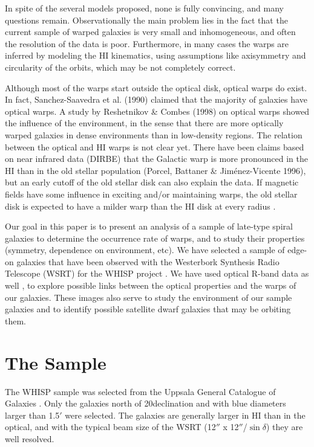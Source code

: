 \documentclass{aa}
\begin{document}
In spite of the several models proposed, none is fully
convincing, and many questions remain. Observationally the main
problem lies in the fact that the current sample of warped galaxies is
very small and inhomogeneous, and often 
the resolution of the data is poor. Furthermore, in
many cases the warps are inferred by modeling the HI
kinematics, using assumptions like axisymmetry and
circularity of the orbits, which may be not completely correct.

Although most of the warps start outside the optical disk,
optical warps do exist. In fact, Sanchez-Saavedra et al. (1990) claimed
that the majority of galaxies have optical warps. A  study by
Reshetnikov \& Combes (1998) on optical warps showed the influence of the 
environment, in the sense that there are more 
optically warped galaxies in dense environments than in low-density
regions. The relation between the optical and HI
warps is not clear yet. There have been claims based on near infrared
data (DIRBE) that the Galactic warp is more pronounced in 
the HI than in the old stellar population (Porcel, Battaner \&
Jim\'enez-Vicente 1996), but an early 
cutoff of the old stellar disk \cite{robin} can also explain the data. If
magnetic fields have 
some influence in exciting and/or maintaining warps, the old stellar
disk is expected to have a milder warp than the HI disk at every
radius \cite{jorge}.

Our goal in this paper is to present an analysis of a sample of late-type spiral galaxies to
determine the occurrence rate of warps, and to study their properties
(symmetry, dependence on environment, etc).
We have selected a sample of edge-on galaxies that have been observed
with the Westerbork Synthesis Radio Telescope (WSRT) for the WHISP
project \cite{whisp}. We have
used optical R-band data as well \cite{sm}, to explore possible links
between the optical properties and the warps of
our galaxies. These images also serve to study the environment of
our sample galaxies and to identify possible 
satellite dwarf galaxies that may be orbiting them.

\section{The Sample}

The WHISP sample \cite {whisp} was selected from the Uppsala
General Catalogue of Galaxies \cite{ugc}. Only the galaxies north of
20\degr declination and with blue diameters larger than 1.5$'$
were selected. The galaxies are generally larger 
in HI than in the optical, and with the typical beam size of the WSRT 
(12$''$ x 12$''$/$\sin\delta$) they are well resolved. 
\end{document}
